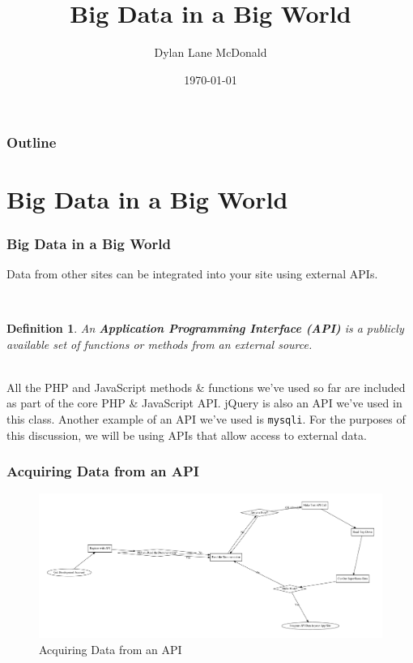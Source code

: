 \documentclass[aspectratio=169]{beamer}
\title{Big Data in a Big World}
\author{Dylan Lane McDonald}
\institute{CNM STEMulus Center\\Web Development with PHP}
\date{\today}
\newtheorem{defn}{Definition}
\begin{document}
\lstset{language=Java}
\begin{frame}
\titlepage
\end{frame}

\begin{frame}
\frametitle{Outline}
\tableofcontents
\end{frame}

\section{Big Data in a Big World}
\begin{frame}
\frametitle{Big Data in a Big World}
Data from other sites can be integrated into your site using external APIs.

\mbox{}\\
\begin{defn}
An \textbf{Application Programming Interface (API)} is a publicly available set of functions or methods from an external source.
\end{defn}

\mbox{}\\
All the PHP and JavaScript methods \& functions we've used so far are included as part of the core PHP \& JavaScript API. jQuery is also an API we've used in this class. Another example of an API we've used is \texttt{mysqli}. For the purposes of this discussion, we will be using APIs that allow access to external data.
\end{frame}

\begin{frame}
\frametitle{Acquiring Data from an API}
\begin{figure}
\includegraphics[scale=0.2]{../artifacts/json-roadmap.pdf}
\caption{Acquiring Data from an API}
\label{fig:jsonflow}
\end{figure}
\end{frame}
\end{document}
